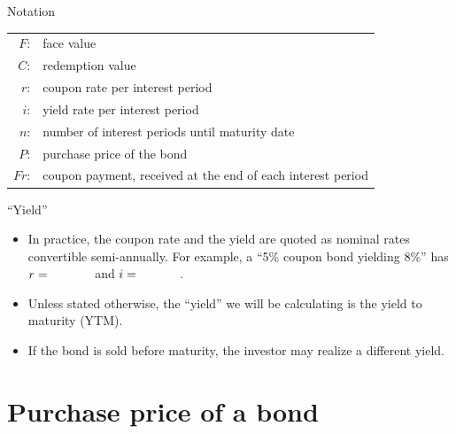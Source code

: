 \documentclass{beamer}
\begin{document}
\begin{frame}{Notation}

\renewcommand{\arraystretch}{1.3}
\begin{tabular}{r>{\raggedright\arraybackslash}p{}}
$F$: & face value \\
$C$: & redemption value \\
$r$: & coupon rate per interest period \\
$i$: & yield rate per interest period \\
$n$: & number of interest periods until maturity date \\
$P$: & purchase price of the bond \\
$Fr$: & coupon payment, received at the end of each interest period \\
\end{tabular}

\end{frame}

\begin{frame}{``Yield''}

\begin{itemize}
\item In practice, the coupon rate and the yield are quoted as nominal rates convertible semi-annually. For example, a ``5\% coupon bond yielding 8\%'' has $r = \hspace{1.2cm}$ and $i = \hspace{1.2cm}$.
\item Unless stated otherwise, the ``yield'' we will be calculating is the yield to maturity (YTM).
\item If the bond is sold before maturity, the investor may realize a different yield.
\end{itemize}

\end{frame}

\section{Purchase price of a bond}
\end{document}
